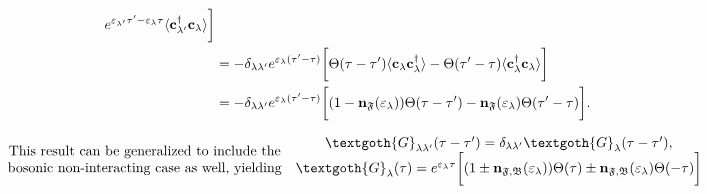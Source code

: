 \begin{equation}
\begin{split}
    e^{\varepsilon_{\lambda'} \tau' - \varepsilon_{\lambda} \tau} \langle {\bf c}_{\lambda'}^\dagger {\bf c}_{\lambda} \rangle
    \bigg] \\
    &= - \delta_{\lambda \lambda'} e^{\varepsilon_{\lambda} (\tau'-\tau)}
    \bigg[
    \Theta(\tau - \tau') 
    \langle {\bf c}_{\lambda} {\bf c}_{\lambda}^\dagger \rangle
    - \Theta(\tau' - \tau) 
     \langle {\bf c}_{\lambda}^\dagger {\bf c}_{\lambda} \rangle
    \bigg] \\
    &= - \delta_{\lambda \lambda'} e^{\varepsilon_{\lambda} (\tau'-\tau)}
    \bigg[ (1 - {\bf n}_{\mathfrak{F}}(\varepsilon_{\lambda}))
    \Theta(\tau - \tau') 
    - {\bf n}_{\mathfrak{F}}(\varepsilon_{\lambda}) \Theta(\tau' - \tau) 
    \bigg].
    \end{split} 
\end{equation}

\begin{equation}
    \begin{array}{cc}
         \textnormal{This result can be generalized to include the}  \\
         \textnormal{bosonic non-interacting case as well, yielding}
    \end{array} 
    \begin{array}{cc}
         \textgoth{G}_{\lambda \lambda'}(\tau - \tau') = \delta_{\lambda \lambda'} \textgoth{G}_{\lambda}(\tau - \tau'), \\
         \textgoth{G}_{\lambda}(\tau) = e^{\varepsilon_{\lambda} \tau}
    \bigg[ (1 \pm {\bf n}_{\mathfrak{F}, \mathfrak{B}}(\varepsilon_{\lambda}))
    \Theta(\tau) 
    \pm {\bf n}_{\mathfrak{F}, \mathfrak{B}}(\varepsilon_{\lambda}) \Theta(- \tau) 
    \bigg]
    \end{array}
\end{equation}

